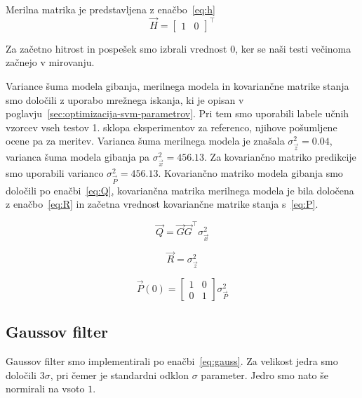 Merilna matrika je predstavljena z enačbo~\eqref{eq:h}
\begin{equation}
\vec{H} = \begin{bmatrix}
				1 & 0
			\end{bmatrix}^\top 
            \label{eq:h}
\end{equation}

Za začetno hitrost in pospešek smo izbrali vrednost $0$, ker se naši testi večinoma začnejo v mirovanju. 

Variance šuma modela gibanja, merilnega modela in kovariančne matrike stanja smo določili z uporabo mrežnega iskanja, ki je opisan v poglavju~\ref{sec:optimizacija-svm-parametrov}. Pri tem smo uporabili labele učnih vzorcev vseh testov 1. sklopa eksperimentov za referenco, njihove pošumljene ocene pa za meritev. Varianca šuma merilnega modela je znašala $\sigma_\vec{z}^2 = \num{0.04}$, varianca šuma modela gibanja pa $\sigma_\vec{x}^2 = \num{456.13}$. Za kovariančno matriko predikcije smo uporabili varianco $\sigma_\vec{P}^2 = \num{456.13}$. Kovariančno matriko modela gibanja smo določili po enačbi~\eqref{eq:Q}, kovariančna matrika merilnega modela je bila določena z enačbo~\eqref{eq:R} in začetna vrednost kovariančne matrike stanja s~\eqref{eq:P}.

\begin{equation}
\vec{Q} = \vec{G} \vec{G}^\top \sigma_\vec{x}^2
\label{eq:Q}
\end{equation}

\begin{equation}
\vec{R} = \sigma_\vec{z}^2
\label{eq:R}
\end{equation}

\begin{equation}
\vec{P}(0) = \begin{bmatrix}
1 & 0 \\
0 & 1
\end{bmatrix} \sigma_\vec{P}^2
\label{eq:P}
\end{equation}










\subsection{Gaussov filter}\label{sec:implementacija-gauss}

Gaussov filter smo implementirali po enačbi~\eqref{eq:gauss}. Za velikost jedra smo določili $3\sigma$, pri čemer je standardni odklon $\sigma$ parameter. Jedro smo nato še normirali na vsoto $1$. 

